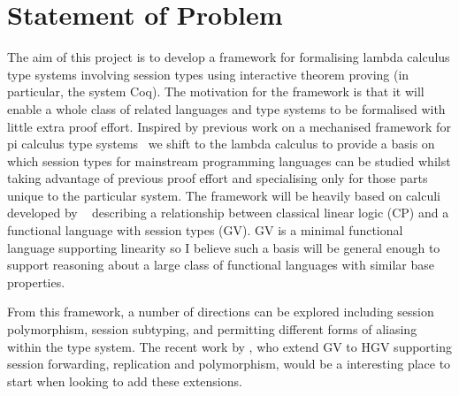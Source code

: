 \documentclass{mprop}
\begin{document}

\section{Statement of Problem}

The aim of this project is to develop a framework for formalising lambda
calculus type systems involving session types using interactive theorem
proving (in particular, the system Coq). The motivation for the framework is
that it will enable a whole class of related languages and type systems to be
formalised with little extra proof effort. Inspired by previous work on a
mechanised framework for pi calculus type systems~\cite{Gay:2001:FFP} we
shift to the lambda calculus to provide a basis on which session types for
mainstream programming languages can be studied whilst taking advantage of
previous proof effort and specialising only for those parts unique to the
particular system. The framework will be heavily based on calculi developed by \citeauthor{Walder:2012}~\cite{Wadler:2012} describing a relationship between classical linear logic (CP) and a functional language with session types (GV). GV is a minimal functional language supporting linearity so I believe such a basis will be general enough to support reasoning about a large class of functional languages with similar base properties.

From this framework, a number of directions can be explored including
session polymorphism, session subtyping, and permitting different forms of
aliasing within the type system. The recent work by \citeauthor{Lindley:2014:SAP} \cite{Lindley:2014:SAP}, who extend GV to HGV supporting session forwarding, replication and polymorphism, would be a interesting place to start when looking to add these extensions.
\end{document}
